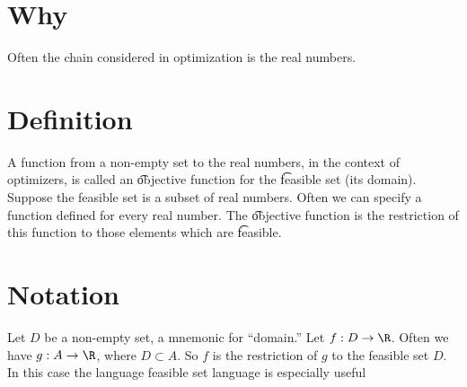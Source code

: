 
\section*{Why}

Often the chain considered in optimization is the real numbers.

\section*{Definition}

A function from a non-empty set to the real numbers, in the context of optimizers, is called an \t{objective function} for the \t{feasible set} (its domain).
Suppose the feasible set is a subset of real numbers.
Often we can specify a function defined for every real number.
The \t{objective function} is the restriction of this function to those elements which are \t{feasible}.

\section*{Notation}

Let $D$ be a non-empty set, a mnemonic for ``domain.''
Let $f: D \to \R $.
Often we have $g: A \to \R $, where $D \subset A$.
So $f$ is the restriction of $g$ to the feasible set $D$.
In this case the language feasible set language is especially useful


\blankpage